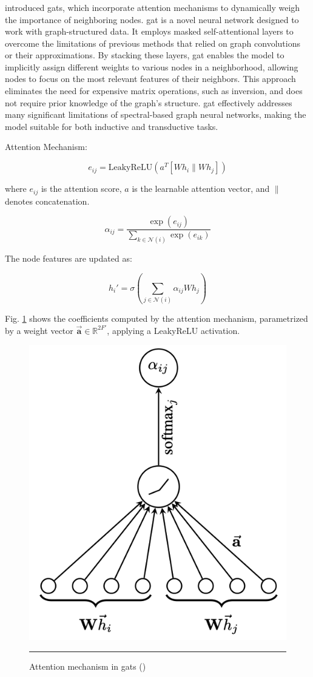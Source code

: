 \subsubsection*{}

\cite{Velickovic2018} introduced \glspl{gat}, which incorporate attention mechanisms to dynamically weigh the importance of neighboring nodes.
\gls{gat} is a novel neural network designed to work with graph-structured data.
It employs masked self-attentional layers to overcome the limitations of previous methods that relied on graph convolutions or their approximations.
By stacking these layers, \gls{gat} enables the model to implicitly assign different weights to various nodes in a neighborhood, allowing nodes to focus on the most relevant features of their neighbors.
This approach eliminates the need for expensive matrix operations, such as inversion, and does not require prior knowledge of the graph's structure.
\gls{gat} effectively addresses many significant limitations of spectral-based graph neural networks, making the model suitable for both inductive and transductive tasks.

Attention Mechanism:

\[ e_{ij} = \text{LeakyReLU}\left(a^T [W h_i \| W h_j]\right) \]

where \( e_{ij} \) is the attention score, \( a \) is the learnable attention vector, and \( \| \) denotes concatenation.

\[ \alpha_{ij} = \frac{\exp(e_{ij})}{\sum_{k \in \mathcal{N}(i)} \exp(e_{ik})} \]

The node features are updated as:

\[ h_i' = \sigma\left(\sum_{j \in \mathcal{N}(i)} \alpha_{ij} W h_j\right) \]

Fig. \ref{fig:gat-attention-mechanism} shows the coefficients computed by the attention mechanism, parametrized by a weight vector $\vec{\mathbf{a}} \in \mathbb{R}^{2F'}$, applying a LeakyReLU activation.
\begin{figure}[htbp]
    \centering
 \includegraphics[width=.3\textwidth]{03_Figures/literature-review/gat-attention-mechanism.png}
     \rule{35em}{0.5pt}
    \caption{Attention mechanism in \glspl{gat} (\cite{Velickovic2018})} 
 \label{fig:gat-attention-mechanism}
\end{figure}


